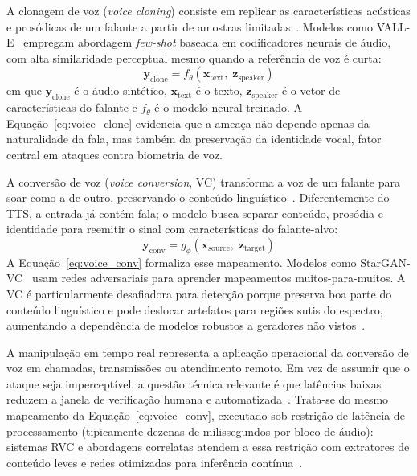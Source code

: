 \documentclass[12pt,a4paper]{article}
\begin{document}
A clonagem de voz (\textit{voice cloning}) consiste em replicar as
características acústicas e prosódicas de um falante a partir de amostras
limitadas~\cite{jia2018}. Modelos como VALL-E~\cite{wang2023vall}
empregam abordagem \textit{few-shot} baseada em codificadores neurais de áudio,
com alta similaridade perceptual mesmo quando a referência de voz é curta:
\begin{equation}
	\label{eq:voice_clone}
	\mathbf{y}_{\mathrm{clone}} = f_{\theta}(\mathbf{x}_{\mathrm{text}},\; \mathbf{z}_{\mathrm{speaker}})
\end{equation}
\noindent
em que $\mathbf{y}_{\mathrm{clone}}$ é o áudio sintético,
$\mathbf{x}_{\mathrm{text}}$ é o texto,
$\mathbf{z}_{\mathrm{speaker}}$ é o vetor de características do falante e $f_{\theta}$ é o
modelo neural treinado. A Equação~\ref{eq:voice_clone} evidencia que a ameaça
não depende apenas da naturalidade da fala, mas também da preservação da
identidade vocal, fator central em ataques contra biometria de voz.

A conversão de voz (\textit{voice conversion}, VC) transforma a voz de um
falante para soar como a de outro, preservando o conteúdo linguístico~\cite{bird2023realtime}. Diferentemente do TTS, a entrada já contém fala; o
modelo busca separar conteúdo, prosódia e identidade para reemitir o sinal com
características do falante-alvo:
\begin{equation}
	\label{eq:voice_conv}
	\mathbf{y}_{\mathrm{conv}} = g_{\phi}(\mathbf{x}_{\mathrm{source}},\; \mathbf{z}_{\mathrm{target}})
\end{equation}
A Equação~\ref{eq:voice_conv} formaliza esse mapeamento. Modelos como
StarGAN-VC~\cite{kameoka2018stargan} usam redes adversariais para aprender
mapeamentos muitos-para-muitos. A VC é particularmente desafiadora para
detecção porque preserva boa parte do conteúdo linguístico e pode deslocar
artefatos para regiões sutis do espectro, aumentando a dependência de modelos
robustos a geradores não vistos~\cite{wang2024asvspoof5}.

A manipulação em tempo real representa a aplicação operacional da conversão de
voz em chamadas, transmissões ou atendimento remoto. Em vez de assumir que o
ataque seja imperceptível, a questão técnica relevante é que latências baixas
reduzem a janela de verificação humana e automatizada~\cite{pindrop2025}.
Trata-se do mesmo mapeamento da Equação~\ref{eq:voice_conv}, executado sob
restrição de latência de processamento (tipicamente dezenas de milissegundos
por bloco de áudio): sistemas RVC e abordagens correlatas atendem a essa
restrição com extratores de conteúdo leves e redes otimizadas para inferência
contínua~\cite{bird2023realtime}.
\end{document}

